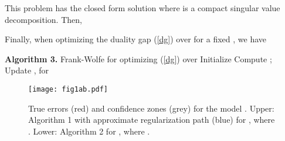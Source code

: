 \documentclass{article}
\begin{document}
This problem has the closed form solution 
where  is a compact singular value decomposition. Then,


Finally, when optimizing the duality gap (\ref{dg}) over  for a fixed , we have


\begin{algorithm}                    \begin{algorithmic}                    \State \textbf{Algorithm 3.} Frank-Wolfe for optimizing (\ref{dg}) over 
	\State Initialize 
    	\State Compute ; 
        \State Update , for 
    \EndFor
\end{algorithmic}
\end{algorithm}

\begin{figure}
\centering
\texttt{[image: fig1ab.pdf]}
\caption{True errors (red) and confidence zones (grey) for the model . Upper: Algorithm 1 with approximate regularization path (blue) for , where . Lower: Algorithm 2 for , where .}
\end{figure}
\end{document}
